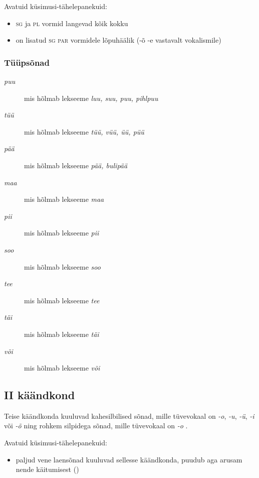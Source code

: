 \documentclass[12pt,a4paper]{article}
\newcommand{\vadja}[1]{\textit{#1}}
\newcommand{\msd}[1]{\textsc{#1}}
\begin{document}
Avatuid küsimusi-tähelepanekuid:
\begin{itemize}
\item \msd{sg} ja \msd{pl} vormid langevad kõik kokku
\item on lisatud \msd{sg par} vormidele lõpuhäälik (-õ -e vastavalt vokalismile)
\end{itemize}

\subsubsection*{Tüüpsõnad}

\begin{description}
\item [\vadja{puu}] mis hõlmab lekseeme \vadja{luu, suu, puu, pihlpuu}
\item [\vadja{tüü}] mis hõlmab lekseeme \vadja{tüü, vüü, üü, püü}
\item [\vadja{pää}] mis hõlmab lekseeme \vadja{pää, bulipää}
\item [\vadja{maa}] mis hõlmab lekseeme \vadja{maa}
\item [\vadja{pii}] mis hõlmab lekseeme \vadja{pii}
\item [\vadja{soo}] mis hõlmab lekseeme \vadja{soo}
\item [\vadja{tee}] mis hõlmab lekseeme \vadja{tee}
\item [\vadja{täi}] mis hõlmab lekseeme \vadja{täi}
\item [\vadja{või}] mis hõlmab lekseeme \vadja{või}
\end{description}


\subsection{\RN{2} käändkond}

Teise käändkonda kuuluvad kahesilbilised sõnad, mille tüvevokaal on \vadja{-o}, \vadja{-u}, \vadja{-ü}, \vadja{-i} või \vadja{-õ} ning rohkem silpidega sõnad, mille tüvevokaal on \vadja{-o} \cite[42]{ariste_grammar_1968}.

Avatuid küsimusi-tähelepanekuid:
\begin{itemize}
\item paljud vene laensõnad kuuluvad sellesse käändkonda, puudub aga arusam nende käitumisest (\cite{rozanskij_zaimstvovannyje_2009-1})
\end{itemize}
\end{document}
